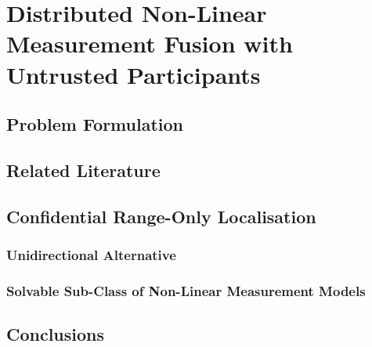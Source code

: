 
\chapter{Distributed Non-Linear Measurement Fusion with Untrusted Participants}
\section{Problem Formulation}
\section{Related Literature}
\section{Confidential Range-Only Localisation}
\subsection{Unidirectional Alternative}
\subsection{Solvable Sub-Class of Non-Linear Measurement Models}
\section{Conclusions}